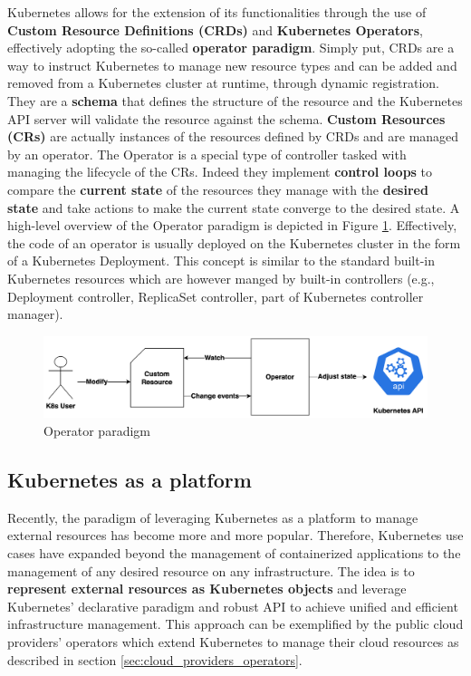 
Kubernetes allows for the extension of its functionalities through the use of \textbf{Custom Resource Definitions (CRDs)} and \textbf{Kubernetes Operators}, effectively adopting the so-called \textbf{operator paradigm}.
Simply put, CRDs are a way to instruct Kubernetes to manage new resource types and can be added and removed from a Kubernetes cluster at runtime, through dynamic registration.
They are a \textbf{schema} that defines the structure of the resource and the Kubernetes API server will validate the resource against the schema.
\textbf{Custom Resources (CRs)} are actually instances of the resources defined by CRDs and are managed by an operator.
The Operator is a special type of controller tasked with managing the lifecycle of the CRs.
Indeed they implement \textbf{control loops} to compare the \textbf{current state} of the resources they manage with the \textbf{desired state} and take actions to make the current state converge to the desired state.
A high-level overview of the Operator paradigm is depicted in Figure \ref{fig:operator_paradigm}.
Effectively, the code of an operator is usually deployed on the Kubernetes cluster in the form of a Kubernetes Deployment.
This concept is similar to the standard built-in Kubernetes resources which are however manged by built-in controllers (e.g., Deployment controller, ReplicaSet controller, part of Kubernetes controller manager).

\begin{figure}[t]
    \centering
    \includegraphics[width=1\linewidth]{images/opeartor_paradigm.png}
    \caption{Operator paradigm}
    \label{fig:operator_paradigm}
\end{figure}

\subsection{Kubernetes as a platform}

Recently, the paradigm of leveraging Kubernetes as a platform to manage external resources has become more and more popular.
Therefore, Kubernetes use cases have expanded beyond the management of containerized applications to the management of any desired resource on any infrastructure.
The idea is to \textbf{represent external resources as Kubernetes objects} and leverage Kubernetes' declarative paradigm and robust API to achieve unified and efficient infrastructure management.
This approach can be exemplified by the public cloud providers' operators which extend Kubernetes to manage their cloud resources as described in section \ref{sec:cloud_providers_operators}.

